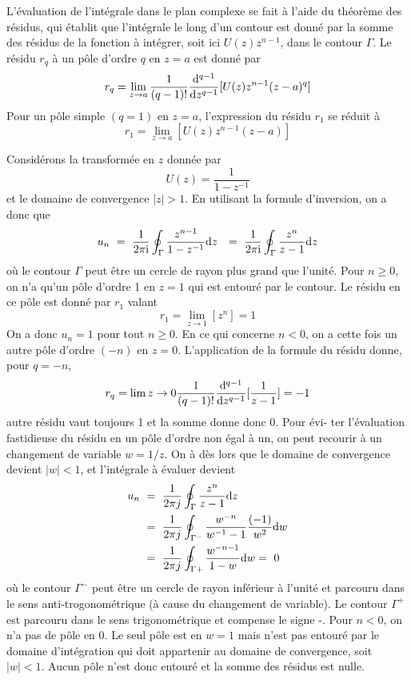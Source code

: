 \begin{proposition}
{L'\'{e}valuation de l'int\'{e}grale dans le plan complexe se fait \`{a} l'aide du th\'{e}or\`{e}me des r\'{e}sidus, qui \'{e}tablit que l'int\'{e}grale le long d'un contour est donn\'{e} par la somme des r\'{e}sidus de la fonction \`{a} int\'{e}grer, soit ici $U(z)z^{n-1}$, dans le contour $\Gamma$. Le r\'{e}sidu $r_{q}$ \`{a} un p\^{o}le d'ordre $q$ en $z=a$ est donn\'{e} par
\begin{equation}
\label{eq:residu-q}
r_{q}=\lim_{z\rightarrow a}\frac{1}{(q-1)!}\frac{\mathrm{d} ^{q-1}}{\mathrm{d} z^{q-1}}[U(z)z^{n-1}(z-a)^{q}]
\end{equation}
Pour un p\^{o}le simple $(q=1)$ en $z=a$, l'expression du r\'{e}sidu $r_{1}$ se r\'{e}duit \`{a}
\begin{equation}
\label{eq:residu-simple}
r_{1}=\lim_{z\rightarrow a}[U(z)z^{n-1}(z-a)]
\end{equation}
\begin{example}
Consid\'{e}rons la transform\'{e}e en $z$ donn\'{e}e par
$$
U(z)=\frac{1}{1-z^{-1}}
$$
et le domaine de convergence $|z|>1$. En utilisant la formule d'inversion, on a donc que
\begin{align*}
u_n\ &=\ \frac{1}{2\pi \mathrm{i}}\oint_{\Gamma}\frac{z^{n-1}}{1-z^{-1}}\mathrm{d} z
&=\ \frac{1}{2\pi \mathrm{i}}\oint_{\Gamma}\frac{z^{n}}{z-1}\mathrm{d} z
\end{align*}
o\`{u} le contour $\Gamma$ peut \^{e}tre un cercle de rayon plus grand que l'unit\'{e}. Pour $n\geq 0$, on n'a qu'un p\^{o}le d'ordre 1 en $z=1$ qui est entour\'{e} par le contour. Le r\'{e}sidu en ce p\^{o}le est donn\'{e} par $r_{1}$ valant
$$
r_{1}=\lim_{z\rightarrow 1}[z^{n}]=1
$$
On a donc $u_n=1$ pour tout $n \geq 0$. En ce qui concerne $n<0$, on a cette fois un autre p\^{o}le d'ordre $(-n)$ en $z=0$.
L'application de la formule du r\'{e}sidu donne, pour $q=-n$,
$$
 r_{q}=\lim {z\rightarrow 0} \frac{1}{(q-1)!}\frac{\mathrm{d} ^{q-1}}{\mathrm{d} z^{q-1}}[\frac{1}{z-1}]=-1
$$
autre r\'{e}sidu vaut toujours 1 et la somme donne donc $0$.
Pour \'{e}vi- ter l'\'{e}valuation fastidieuse du r\'{e}sidu en un p\^{o}le d'ordre non \'{e}gal \`{a} un, on peut recourir \`{a} un changement de variable $w=1/z$. On \`{a} d\`{e}s lors que le domaine de convergence devient $|w|<1$, et l'int\'{e}grale \`{a} \'{e}valuer devient
\begin{align*}
u_n\ &=\ \frac{1}{2\pi j}\oint_{\Gamma}\frac{z^{n}}{z-1}\mathrm{d}  z \\
     &=\ \frac{1}{2\pi j}\oint_{\Gamma^{-}}\frac{w^{-n}}{w^{-1}-1}\frac{(-1)}{w^{2}}\mathrm{d} w\\
     &=\ \frac{1}{2\pi j}\oint_{\Gamma+}\frac{w^{-n-1}}{1-w}\mathrm{d}  w =\ 0
\end{align*}
o\`{u} le contour $\Gamma^{-}$ peut \^{e}tre un cercle de rayon inf\'{e}rieur \`{a} l'unit\'{e} et parcouru dans le sens anti-trogonométrique (à cause du changement de variable). Le contour $\Gamma^{+}$ est parcouru dans le sens trigonométrique et compense le signe -. Pour $n<0$, on n'a pas de p\^{o}le en $0$. Le seul p\^{o}le est en $w=1$ mais n'est pas entour\'{e} par le domaine d'int\'{e}gration qui doit appartenir au domaine de convergence, soit $|w|<1$. Aucun p\^{o}le n'est donc entour\'{e} et la somme des r\'{e}sidus est nulle.
\end{example}
}
\end{proposition}
